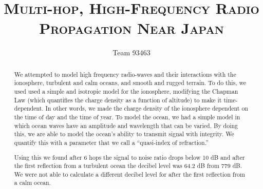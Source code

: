 \documentclass[11pt, twocolumn]{article}
\title{
    \textsc{\LARGE{Multi-hop, High-Frequency Radio Propagation Near Japan}}
    }
\author{\Large Team 93463}
\date{\empty}
\numberwithin{equation}{section}
\begin{document}
    \singlespacing
    \maketitle 
    \thispagestyle{fancy} %




    \begin{abstract}
    We attempted to model high frequency radio-waves and their interactions with the ionosphere, turbulent and calm oceans, and smooth and rugged terrain. To do this, we used used a simple and isotropic model for the ionosphere, modifying the Chapman Law (which quantifies the charge density as a function of altitude) to make it time-dependent. In other words, we made the charge density of the ionosphere dependent on the time of day and the time of year. To model the ocean, we had a simple model in which ocean waves have an  amplitude and wavelength that can be varied. By doing this, we are able to model the ocean's ability to transmit signal with integrity. We quantify this with a parameter that we call a ``quasi-index of refraction.''

    Using this we found after 6 hops the signal to noise ratio drops below 10 dB and after the first reflection from a turbulent ocean the decibel level was 64.2 dB from 779 dB. We were not able to calculate a different decibel level for after the first reflection from a calm ocean. 

\end{abstract}
\end{document}
